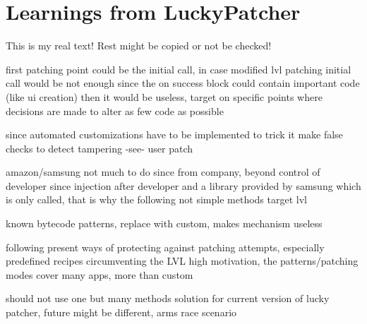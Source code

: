 \section{Learnings from LuckyPatcher}\label{section:luckypatcher-learnings}
This is my real text! Rest might be copied or not be checked!

%
first patching point could be the initial call, in case modified lvl patching initial call would be not enough since the on success block could contain important code (like ui creation) then it would be useless, target on specific points where decisions are made to alter as few code as possible

since automated customizations have to be implemented to trick it
make false checks to detect tampering -see- user patch

amazon/samsung not much to do since from company, beyond control of developer since injection after developer and a library provided by samsung which is only called, that is why the following not simple methods target lvl

known bytecode patterns, replace with custom, makes mechanism useless

following present ways of protecting against patching attempts, especially predefined recipes circumventing the LVL
high motivation, the patterns/patching modes cover many apps, more than custom

should not use one but many methods
solution for current version of lucky patcher, future might be different, arms race scenario
\cite{munteanLicense}
%
